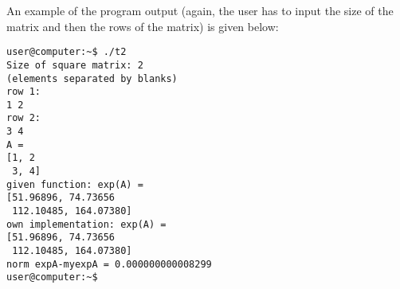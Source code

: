 \documentclass[a4paper,10pt]{article}
\begin{document}
\begin{table}[!ht]
\begin{tabular}{l l l l l l}
{    \right]$} \vspace{2mm} \\
    $||\texttt{r8mat-myexp}||_\infty$ & 0.000000000003638  \\
    \vspace{-2mm} \\ \hline
  \\
  \texttt{ }&\multicolumn{3}{l}{$A = 
    \left[ \begin{array}{cccc}
      1 & 5 & 10 \\
      -1 & -1 & -1 \\
      1 & 1 & 1 
    \end{array}
    \right]$}  \vspace{2mm} \\
    \hline \\ 
    \texttt{r8mat}	& 
    \multicolumn{3}{l}{
    $\left[
      \begin{array}{cccc}
	9.99487 &  23.07888 & 40.68389 \\
	 -3.52100 & -6.90010 & -13.37397 \\
	  3.52100 &  7.90010 & 14.37397
      \end{array}
    \right]$ } \vspace{2mm} \\
    \texttt{myexp}	& 
    \multicolumn{3}{l}{
    $\left[
      \begin{array}{cccc}
	9.99487 &  23.07888 & 40.68389 \\
	 -3.52100 & -6.90010 & -13.37397 \\
	  3.52100 &  7.90010 & 14.37397
      \end{array}
    \right]$} \vspace{2mm} \\
    $||\texttt{r8mat-myexp}||_\infty$ & 0.000000000004794  \\
    \vspace{-2mm} \\ \hline

\end{tabular}
\end{table}

\FloatBarrier



\noindent
An example of the program output (again, the user has to input the size of the matrix and then the rows of the matrix) is given below:
\begin{center}
\begin{minipage}[t]{85mm}
\begin{lstlisting}
user@computer:~$ ./t2 
Size of square matrix: 2
(elements separated by blanks)
row 1:
1 2
row 2:
3 4
A = 
[1, 2
 3, 4]
given function: exp(A) = 
[51.96896, 74.73656
 112.10485, 164.07380]
own implementation: exp(A) = 
[51.96896, 74.73656
 112.10485, 164.07380]
norm expA-myexpA = 0.000000000008299
user@computer:~$ 
\end{lstlisting}
\end{minipage}
\end{center}
\end{document}
